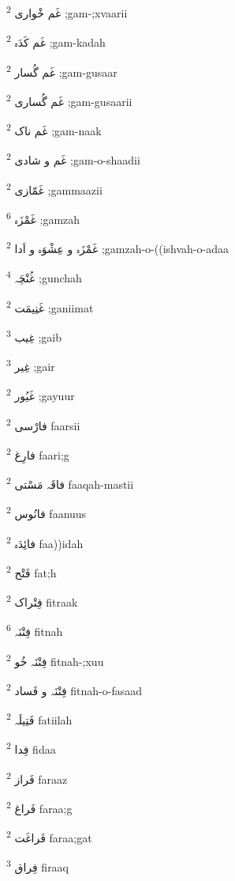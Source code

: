 \documentclass[12pt]{article}
\begin{document}
\begin{multicols}{5}
{\ur غَم خْواری}   \textsuperscript{2} ;gam-;xvaarii

{\ur غَم کَدَہ}   \textsuperscript{2} ;gam-kadah

{\ur غَم گُسار}   \textsuperscript{2} ;gam-gusaar

{\ur غَم گُساری}   \textsuperscript{2} ;gam-gusaarii

{\ur غَم ناک}   \textsuperscript{2} ;gam-naak

{\ur غَم و شادی}   \textsuperscript{2} ;gam-o-shaadii

{\ur غَمّازی}   \textsuperscript{2} ;gammaazii

{\ur غَمْزَہ}   \textsuperscript{6} ;gamzah

{\ur غَمْزَہ و عِشْوَہ و اَدا}   \textsuperscript{2} ;gamzah-o-((ishvah-o-adaa

{\ur غُنْچَہ}   \textsuperscript{4} ;gunchah

{\ur غَنِیمَت}   \textsuperscript{2} ;ganiimat

{\ur غِیب}   \textsuperscript{3} ;gaib

{\ur غِیر}   \textsuperscript{3} ;gair

{\ur غَیُور}   \textsuperscript{2} ;gayuur

{\ur فارْسی}   \textsuperscript{2} faarsii

{\ur فارِغ}   \textsuperscript{2} faari;g

{\ur فاقَہ مَسْتی}   \textsuperscript{2} faaqah-mastii

{\ur فانُوس}   \textsuperscript{2} faanuus

{\ur فائِدَہ}   \textsuperscript{2} faa))idah

{\ur فَتْح}   \textsuperscript{2} fat;h

{\ur فِتْراک}   \textsuperscript{2} fitraak

{\ur فِتْنَہ}   \textsuperscript{6} fitnah

{\ur فِتْنَہ خُو}   \textsuperscript{2} fitnah-;xuu

{\ur فِتْنَہ و فَساد}   \textsuperscript{2} fitnah-o-fasaad

{\ur فَتِیلَہ}   \textsuperscript{2} fatiilah

{\ur فِدا}   \textsuperscript{2} fidaa

{\ur فَراز}   \textsuperscript{2} faraaz

{\ur فَراغ}   \textsuperscript{2} faraa;g

{\ur فَراغَت}   \textsuperscript{2} faraa;gat

{\ur فِراق}   \textsuperscript{3} firaaq


\end{multicols}
\end{document}
